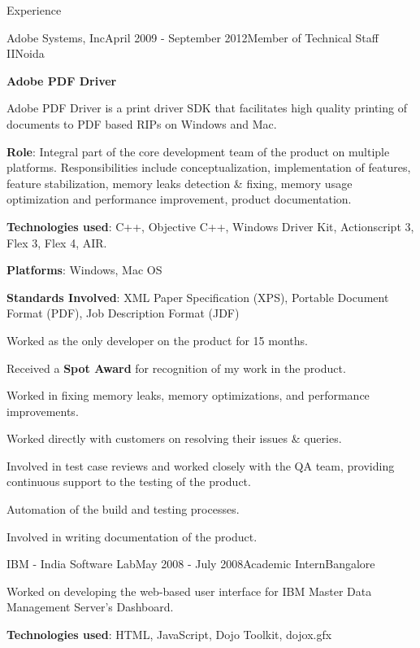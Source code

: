 \documentclass{resume} %
\begin{document}
\begin{rSection}{Experience}
\begin{rSubsection}{Adobe Systems, Inc}{April 2009 - September 2012}{Member of Technical Staff II}{Noida}
\item {\bf Adobe PDF Driver}
\item Adobe PDF Driver is a print driver SDK that facilitates high quality printing of documents to PDF based RIPs on Windows and Mac.
\item {\bf Role}: Integral part of the core development team of the product on multiple platforms. Responsibilities include conceptualization, implementation of features, feature stabilization, memory leaks detection \& fixing, memory usage optimization and performance improvement, product documentation.
\item {\bf Technologies used}: C++, Objective C++, Windows Driver Kit, Actionscript 3, Flex 3, Flex 4, AIR.
\item {\bf Platforms}: Windows, Mac OS
\item {\bf Standards Involved}: XML Paper Specification (XPS), Portable Document Format (PDF), Job Description Format (JDF)
\item Worked as the only developer on the product for 15 months.
\item Received a {\bf Spot Award} for recognition of my work in the product.
\item Worked in fixing memory leaks, memory optimizations, and performance improvements.
\item Worked directly with customers on resolving their issues \& queries.
\item Involved in test case reviews and worked closely with the QA team, providing continuous
support to the testing of the product.
\item Automation of the build and testing processes.
\item Involved in writing documentation of the product.

\end{rSubsection}


\begin{rSubsection}{IBM - India Software Lab}{May 2008 - July 2008}{Academic Intern}{Bangalore}
\item Worked on developing the web-based user interface for IBM Master Data Management Server's Dashboard.
\item {\bf Technologies used}: HTML, JavaScript, Dojo Toolkit, dojox.gfx
\end{rSubsection}

\end{rSection}
\end{document}
